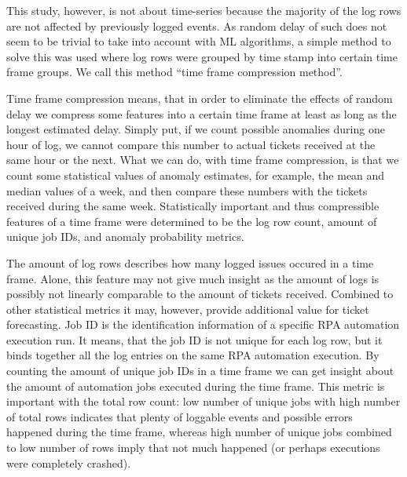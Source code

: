 This study, however,
is not about time-series
because the majority of the log rows
are not affected by previously logged events.
As random delay of such
does not seem to be trivial to take into account
with ML algorithms,
a simple method to solve this was used
where log rows were grouped by time stamp
into certain time frame groups.
We call this method \enquote{time frame compression method}.

Time frame compression means,
that in order to eliminate the effects of random delay
we compress some features into a certain time frame
at least as long as the longest estimated delay.
Simply put,
if we count possible anomalies during one hour of log,
we cannot compare this number to actual tickets received
at the same hour or the next.
What we can do,
with time frame compression,
is that we count some statistical values of anomaly estimates,
for example, the mean and median values of a week,
and then compare these numbers with the tickets received
during the same week.
Statistically important and thus compressible features of a time frame
were determined to be the log row count,
amount of unique job IDs, and anomaly probability metrics.

The amount of log rows describes
how many logged issues occured in a time frame.
Alone,
this feature may not give much insight
as the amount of logs is possibly not linearly comparable
to the amount of tickets received.
Combined to other statistical metrics
it may, however,
provide additional value for ticket forecasting.
Job ID is the identification information of a specific RPA automation execution run.
It means,
that the job ID is not unique for each log row,
but it binds together all the log entries on the same RPA automation execution.
By counting the amount of unique job IDs in a time frame
we can get insight about the amount of automation jobs executed during the time frame.
This metric is important with the total row count:
low number of unique jobs with high number of total rows
indicates that plenty of loggable events and possible errors happened during the time frame,
whereas high number of unique jobs combined to low number of rows
imply that not much happened (or perhaps executions were completely crashed).

